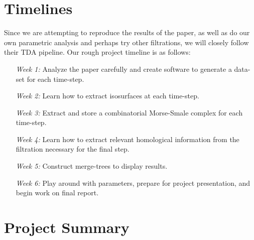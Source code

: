 \documentclass[12pt, fullpage,letterpaper]{article}
\begin{document}
	\section*{\normalfont Timelines}  

	Since we are attempting to reproduce the results of the paper, as well as do our own parametric analysis and perhaps try other filtrations, we will closely follow their TDA pipeline. Our rough project timeline is as follows:
	\begin{enumerate}
		\item[{\textit{Week 1:}}] 
		Analyze the paper carefully and create software to generate a data-set for each time-step.
		\item[{\textit{Week 2:}}] 
		Learn how to extract isosurfaces at each time-step.
		\item[{\textit{Week 3:}}] 
		Extract and store a combinatorial Morse-Smale complex for each time-step.
		\item[{\textit{Week 4:}}] 
		Learn how to extract relevant homological information from the filtration necessary for the final step.
		\item[{\textit{Week 5:}}]  
		Construct merge-trees to display results.
		\item[{\textit{Week 6:}}] 
		Play around with parameters, prepare for project presentation, and begin work on final report. 
	\end{enumerate}  

	\section*{\normalfont Project Summary}  
%		
%		
%		
%		
%		
\end{document}
